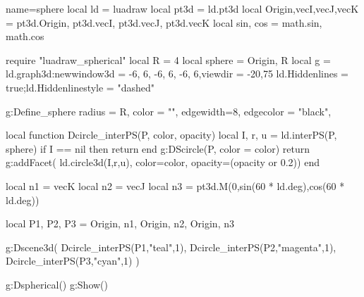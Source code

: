 \documentclass{standalone}
\begin{document}
\begin{luadraw}{name=sphere}
    local ld = luadraw
    local pt3d = ld.pt3d
    local Origin,vecI,vecJ,vecK = pt3d.Origin, pt3d.vecI, pt3d.vecJ, pt3d.vecK
    local sin, cos = math.sin, math.cos

    require "luadraw_spherical"
    local R = 4
    local sphere = {Origin, R}
    local g = ld.graph3d:new{window3d = {-6, 6, -6, 6, -6, 6},viewdir = {-20,75}}
    ld.Hiddenlines = true;ld.Hiddenlinestyle = "dashed"

    g:Define_sphere{
        radius = R,
        color = "",
        edgewidth=8,
        edgecolor = "black",
    }

    local function Dcircle_interPS(P, color, opacity)
        local I, r, u = ld.interPS(P, sphere)
        if I == nil then return end
        g:DScircle(P, {color = color})
        return g:addFacet( ld.circle3d(I,r,u), {color=color, opacity=(opacity or 0.2)})
    end

    local n1 = vecK
    local n2 = vecJ
    local n3 = pt3d.M(0,sin(60 * ld.deg),cos(60 * ld.deg))
    
    local P1, P2, P3 = {Origin, n1}, {Origin, n2}, {Origin, n3}
    
     g:Dscene3d(
        Dcircle_interPS(P1,"teal",1),
        Dcircle_interPS(P2,"magenta",1),
        Dcircle_interPS(P3,"cyan",1)
    )

    g:Dspherical()
    g:Show()
\end{luadraw}
\end{document}
